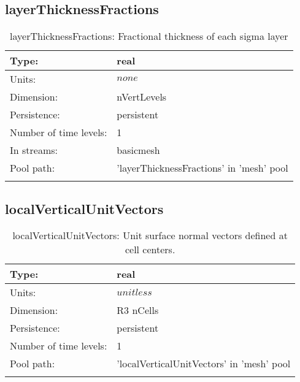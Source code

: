 \subsection[layerThicknessFractions]{layerThicknessFractions}
\label{subsec:var_sec_mesh_layerThicknessFractions}
\begin{center}
\begin{longtable}{| p{2.0in} | p{4.0in} |}
        \hline 
        Type: & real \\
        \hline 
        Units: & $none$ \\
        \hline 
        Dimension: & nVertLevels \\
        \hline 
        Persistence: & persistent \\
        \hline 
        Number of time levels: & 1 \\
        \hline 
		 In streams: &  basicmesh \\
        \hline 
            Pool path: & 'layerThicknessFractions' in 'mesh' pool
 \\
		 \hline 
    \caption{layerThicknessFractions: Fractional thickness of each sigma layer}
\end{longtable}
\end{center}
\subsection[localVerticalUnitVectors]{localVerticalUnitVectors}
\label{subsec:var_sec_mesh_localVerticalUnitVectors}
\begin{center}
\begin{longtable}{| p{2.0in} | p{4.0in} |}
        \hline 
        Type: & real \\
        \hline 
        Units: & $unitless$ \\
        \hline 
        Dimension: & R3 nCells \\
        \hline 
        Persistence: & persistent \\
        \hline 
        Number of time levels: & 1 \\
        \hline 
            Pool path: & 'localVerticalUnitVectors' in 'mesh' pool
 \\
		 \hline 
    \caption{localVerticalUnitVectors: Unit surface normal vectors defined at cell centers.}
\end{longtable}
\end{center}
